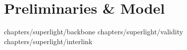 \section{Preliminaries \& Model}

{chapters/superlight/backbone}
{chapters/superlight/validity}
{chapters/superlight/interlink}
